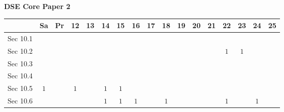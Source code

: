 \documentclass[12pt, a4paper]{article}
\begin{document}
\begin{absolutelynopagebreak}
\begin{center}
\textbf{DSE Core Paper 2}
\end{center}
\begin{center}
\begin{tabular}{|l|c|c|c|c|c|c|c|c|c|c|c|c|c|c|c|c|}
\hline
        & Sa & Pr & 12 & 13 & 14 & 15 & 16 & 17 & 18 & 19 & 20 & 21 & 22 & 23 & 24 & 25 \\\hline\hline
Sec 10.1 &  &  &  &  &  &  &  &  &  &  &  &  &  &  &  &  \\\hline
Sec 10.2 &  &  &  &  &  &  &  &  &  &  &  &  &  $1$ &  $1$ &  &  \\\hline
Sec 10.3 &  &  &  &  &  &  &  &  &  &  &  &  &  &  &  &  \\\hline
Sec 10.4 &  &  &  &  &  &  &  &  &  &  &  &  &  &  &  &  \\\hline
Sec 10.5 &  $1$ &  &  $1$ &  &  $1$ &  $1$ &  &  &  &  &  &  &  &  &  &  \\\hline
Sec 10.6 &  &  &  &  &  $1$ &  $1$ &  $1$ &  &  $1$ &  &  &  &  $1$ &  &  $1$ &  \\\hline
\end{tabular}
\end{center}
\end{absolutelynopagebreak}
\end{document}
